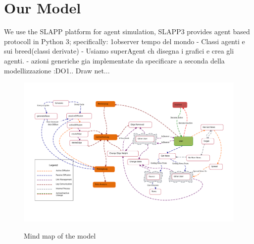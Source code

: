 \section{Our Model}
We use the SLAPP platform for agent simulation,
SLAPP3 provides agent based protocoll in Python 3; specifically: 1observer tempo del mondo - Classi agenti e sui breed(classi derivate) - Usiamo superAgent ch disegna i grafici e crea gli agenti. - azioni generiche gia implementate da specificare a seconda della modellizzazione :DO1.. Draw net... 
\\
\begin{figure}[htpb]
  \centering
  \includegraphics[width=\columnwidth]{mindMap.pdf}
  \label{fig:mindmap}
  \caption{Mind map of the model}
\end{figure}


